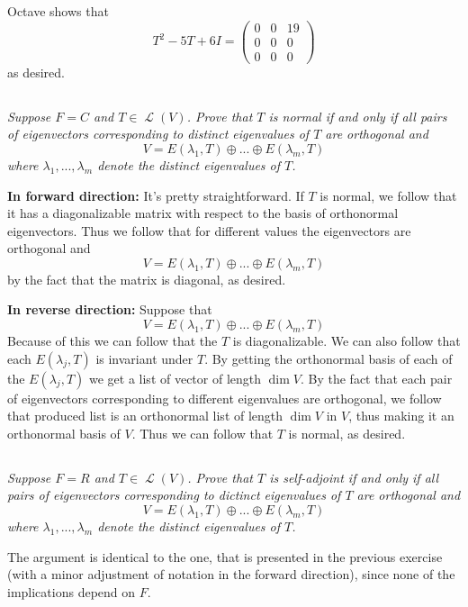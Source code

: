 \documentclass[11pt,oneside,titlepage]{book}
\DeclareMathOperator \map {\mathcal {L}}
\begin{document}
Octave shows that
$$
T^2 - 5T + 6I =
\begin{pmatrix}
  0 & 0 & 19 \\
  0 & 0 & 0 \\
  0 & 0 & 0
\end{pmatrix}
$$
as desired.


\subsection{}

\textit{Suppose $F = C$ and $T \in \map(V)$. Prove that $T$ is normal if and only if
  all pairs of eigenvectors corresponding to distinct eigenvalues of $T$ are orthogonal
  and 
$$V = E(\lambda_1, T) \oplus ... \oplus E(\lambda_m, T)$$
where $\lambda_1, ..., \lambda_m$ denote the distinct eigenvalues of $T$.}

\textbf{In forward direction: }
It's pretty straightforward.
If $T$ is normal, we follow that it has a diagonalizable matrix with respect to the
basis of orthonormal eigenvectors. Thus we follow that for different values the eigenvectors
are orthogonal and
$$V = E(\lambda_1, T) \oplus ... \oplus E(\lambda_m, T)$$
by the fact that the matrix is diagonal, as desired.

\textbf{In reverse direction: }
Suppose that
$$V = E(\lambda_1, T) \oplus ... \oplus E(\lambda_m, T)$$
Because of this we can follow that the $T$ is diagonalizable. We can also follow that each
$E(\lambda_j, T)$ is invariant under $T$. By getting the orthonormal basis of each of the
$E(\lambda_j, T)$ we get a list of vector of length $\dim V$. By the fact that
each pair of eigenvectors corresponding to different eigenvalues are orthogonal, we follow that
produced list is an orthonormal list of length $\dim V$ in $V$, thus making it an
orthonormal basis of $V$. Thus we can follow that $T$ is normal, as desired.

\subsection{}

\textit{Suppose $F = R$ and $T \in \map(V)$. Prove that $T$ is self-adjoint if and only if all
  pairs of eigenvectors corresponding to dictinct eigenvalues of $T$ are orthogonal and 
  $$V = E(\lambda_1, T) \oplus ... \oplus E(\lambda_m, T)$$
  where $\lambda_1, ..., \lambda_m$ denote the distinct eigenvalues of $T$.}

The argument is identical to the one, that is presented in the previous exercise (with a minor
adjustment of notation in the forward direction), since
none of the implications depend on $F$.
\end{document}
